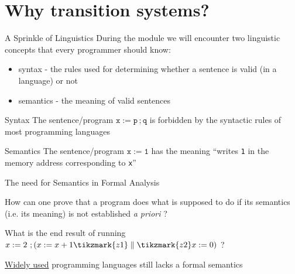\documentclass[aspectratio=169]{beamer}
\begin{document}
\section{Why transition systems?}

\begin{frame}{A Sprinkle of Linguistics}
  During the module we will encounter two linguistic concepts that every programmer
  should know:
  \begin{itemize}
  \item \alert{syntax} - the rules used for determining whether a sentence
    is valid (in a language) or not
  \item \alert{semantics} - the meaning of valid sentences
  \end{itemize}

  \vfill
  \begin{exampleblock}{\exercise Syntax}
      The sentence/program $\mathtt{x := p\, ;q}$ is forbidden by
      the syntactic rules of most programming languages
    \end{exampleblock}
  \begin{exampleblock}{\exercise Semantics}
      The sentence/program $\mathtt{x := 1}$ has the meaning
      ``writes \texttt{1} in the memory address corresponding to \texttt{x}''
  \end{exampleblock}
\end{frame}

\begin{frame}{The need for Semantics in Formal Analysis}

  How can one prove that a program does what is supposed to do if its
  semantics (i.e. its meaning) is not established \emph{a priori} ?

  \begin{exampleblock}{\exercise}
    What is the end result of running
    $x:=2\ ; (x := x + 1 \tikzmark{z1}  \parallel  \tikzmark{z2} x := 0)$ ?
  \end{exampleblock}



   \vfill
   \underline{Widely used} programming languages \alert{still} lacks a formal
   semantics
\end{frame}
\end{document}
